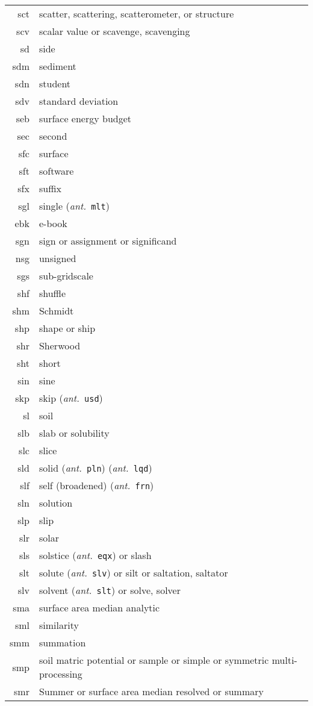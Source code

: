 \documentclass[12pt,twoside]{article}
\newcommand{\ant}[1]{(\textit{ant.}~\texttt{#1})}
\begin{document}
\begin{longtable}[>{\bfseries}l]{>{\ttfamily}r l}
sct & scatter, scattering, scatterometer, or structure \\
scv & scalar value or scavenge, scavenging \\
sd & side \\
sdm & sediment \\
sdn & student \\
sdv & standard deviation \\
seb & surface energy budget \\
sec & second \\
sfc & surface \\
sft & software \\
sfx & suffix \\
sgl & single \ant{mlt} \\
ebk & e-book \\
sgn & sign or assignment or significand \\
nsg & unsigned \\
sgs & sub-gridscale \\
shf & shuffle \\
shm & Schmidt \\
shp & shape or ship \\
shr & Sherwood \\
sht & short \\
sin & sine \\
skp & skip \ant{usd} \\
sl & soil \\
slb & slab or solubility \\
slc & slice \\
sld & solid \ant{pln} \ant{lqd} \\
slf & self (broadened) \ant{frn} \\
sln & solution \\
slp & slip \\
slr & solar \\
sls & solstice \ant{eqx} or slash \\
slt & solute \ant{slv} or silt or saltation, saltator \\
slv & solvent \ant{slt} or solve, solver \\
sma & surface area median analytic \\
sml & similarity \\
smm & summation \\
smp & soil matric potential or sample or simple or symmetric multi-processing \\
smr & Summer or surface area median resolved or summary \\

\end{longtable}
\end{document}
